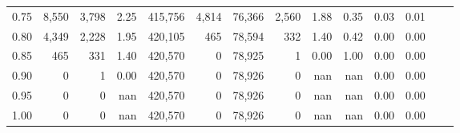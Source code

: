\begin{tabular}{rrrrrrrrrrrrrr}
0.75 &   8,550 &   3,798 &    2.25 &  415,756 &    4,814 &  76,366 &   2,560 &  1.88 &  0.35 &  0.03 &      0.01 \\
0.80 &   4,349 &   2,228 &    1.95 &  420,105 &      465 &  78,594 &     332 &  1.40 &  0.42 &  0.00 &      0.00 \\
0.85 &     465 &     331 &    1.40 &  420,570 &        0 &  78,925 &       1 &  0.00 &  1.00 &  0.00 &      0.00 \\
0.90 &       0 &       1 &    0.00 &  420,570 &        0 &  78,926 &       0 &   nan &   nan &  0.00 &      0.00 \\
0.95 &       0 &       0 &     nan &  420,570 &        0 &  78,926 &       0 &   nan &   nan &  0.00 &      0.00 \\
1.00 &       0 &       0 &     nan &  420,570 &        0 &  78,926 &       0 &   nan &   nan &  0.00 &      0.00 \\
\bottomrule
\end{tabular}
